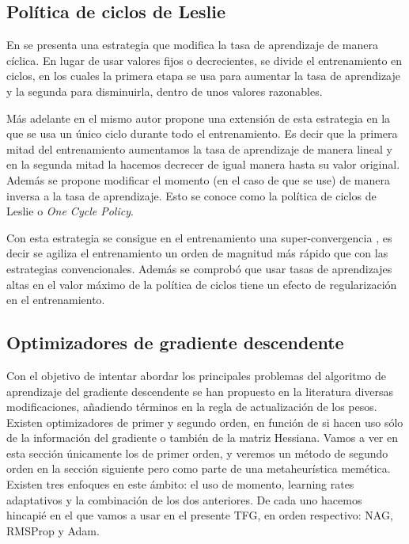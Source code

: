 \subsection{Política de ciclos de Leslie}

En \cite{leslie1} se presenta una estrategia que modifica la tasa de aprendizaje de manera cíclica. En lugar de usar valores fijos o decrecientes, se divide el entrenamiento en ciclos, en los cuales la primera etapa se usa para aumentar la tasa de aprendizaje y la segunda para disminuirla, dentro de unos valores razonables. 

Más adelante en \cite{leslie2} el mismo autor propone una extensión de esta estrategia en la que se usa un único ciclo durante todo el entrenamiento. Es decir que la primera mitad del entrenamiento aumentamos la tasa de aprendizaje de manera lineal y en la segunda mitad la hacemos decrecer de igual manera hasta su valor original. Además se propone modificar el momento (en el caso de que se use) de manera inversa a la tasa de aprendizaje. Esto se conoce como la política de ciclos de Leslie o \textit{One Cycle Policy}.

Con esta estrategia se consigue en el entrenamiento una super-convergencia \cite{leslie3}, es decir se agiliza el entrenamiento un orden de magnitud más rápido que con las estrategias convencionales. Además se comprobó que usar tasas de aprendizajes altas en el valor máximo de la política de ciclos tiene un efecto de regularización en el entrenamiento.

\subsection{Optimizadores de gradiente descendente}
\label{sec:gd}
Con el objetivo de intentar abordar los principales problemas del algoritmo de aprendizaje del gradiente descendente se han propuesto en la literatura diversas modificaciones, añadiendo términos en la regla de actualización de los pesos. Existen optimizadores de primer y segundo orden, en función de si hacen uso sólo de la información del gradiente o también de la matriz Hessiana. Vamos a ver en esta sección únicamente los de primer orden, y veremos un método de segundo orden en la sección siguiente pero como parte de una metaheurística memética. Existen tres enfoques en este ámbito: el uso de momento, learning rates adaptativos y la combinación de los dos anteriores. De cada uno hacemos hincapié en el que vamos a usar en el presente TFG, en orden respectivo: NAG, RMSProp y Adam.

